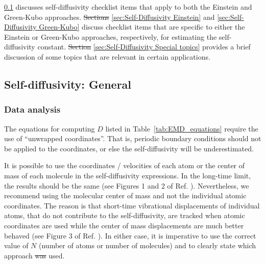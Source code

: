 \documentclass[9pt,bestpractices]{livecoms}
\providecommand{\DIFadd}[1]{{\protect\color{blue}\uwave{#1}}} %
\providecommand{\DIFdel}[1]{{\protect\color{red}\sout{#1}}}                      %
\providecommand{\DIFaddbegin}{} %
\providecommand{\DIFaddend}{} %
\providecommand{\DIFdelbegin}{} %
\providecommand{\DIFdelend}{} %
\begin{document}
\DIFadd{Sec.\ }\DIFaddend \ref{sec:Self-Diffusivity General} discusses self-diffusivity checklist items that apply to both the Einstein and Green-Kubo approaches. \DIFdelbegin \DIFdel{Sections }\DIFdelend \DIFaddbegin \DIFadd{Secs.\ }\DIFaddend \ref{sec:Self-Diffusivity Einstein} and \ref{sec:Self-Diffusivity Green-Kubo} discuss checklist items that are specific to either the Einstein or Green-Kubo approaches, respectively, for estimating the self-diffusivity constant. \DIFdelbegin \DIFdel{Section }\DIFdelend \DIFaddbegin \DIFadd{Sec.\ }\DIFaddend \ref{sec:Self-Diffusivity Special topics} provides a brief discussion of some topics that are relevant in certain applications.

\subsection{Self-diffusivity: General} \label{sec:Self-Diffusivity General}


\subsubsection{Data analysis} \label{sec:Self-Diffusivity:General: Data analysis}

The equations for computing $D$ listed in Table~\ref{tab:EMD_equations} require the use of ``unwrapped coordinates''. That is, periodic boundary conditions should not be applied to the coordinates, or else the self-diffusivity will be underestimated. 
\DIFaddbegin 

\DIFaddend It is possible to use the coordinates / velocities of each atom or the center of mass of each molecule in the self-diffusivity expressions. In the long-time limit, the results should be the same (see Figures 1 and 2 of Ref. \cite{Mondello1997}). Nevertheless, we recommend using the molecular center of mass and not the individual atomic coordinates. The reason is that short-time vibrational displacements of individual atoms, that do not contribute to the self-diffusivity, are tracked when atomic coordinates are used while the center of mass displacements are much better behaved (see Figure 3 of Ref. \cite{Mondello1997}). In either case, it is imperative to use the correct value of $N$ (number of atoms or number of molecules) and to clearly state which approach \DIFdelbegin \DIFdel{was }\DIFdelend \DIFaddbegin \DIFadd{is }\DIFaddend used.
\end{document}
